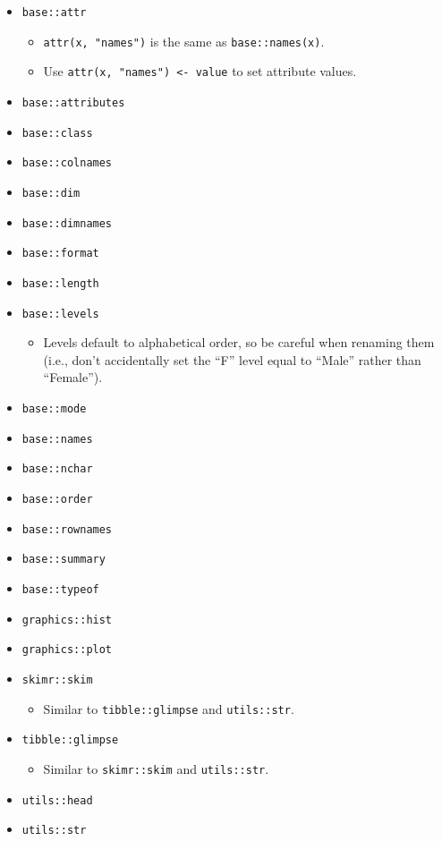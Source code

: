 \documentclass[
]{book}
\providecommand{\tightlist}{%
  \setlength{\itemsep}{0pt}\setlength{\parskip}{0pt}}
\begin{document}
\begin{itemize}
\tightlist
\item
  \texttt{base::attr}

  \begin{itemize}
  \tightlist
  \item
    \texttt{attr(x,\ "names")} is the same as \texttt{base::names(x)}.
  \item
    Use \texttt{attr(x,\ "names")\ \textless{}-\ value} to set attribute values.
  \end{itemize}
\item
  \texttt{base::attributes}
\item
  \texttt{base::class}
\item
  \texttt{base::colnames}
\item
  \texttt{base::dim}
\item
  \texttt{base::dimnames}
\item
  \texttt{base::format}
\item
  \texttt{base::length}
\item
  \texttt{base::levels}

  \begin{itemize}
  \tightlist
  \item
    Levels default to alphabetical order, so be careful when renaming them (i.e., don't accidentally set the ``F'' level equal to ``Male'' rather than ``Female'').
  \end{itemize}
\item
  \texttt{base::mode}
\item
  \texttt{base::names}
\item
  \texttt{base::nchar}
\item
  \texttt{base::order}
\item
  \texttt{base::rownames}
\item
  \texttt{base::summary}
\item
  \texttt{base::typeof}
\item
  \texttt{graphics::hist}
\item
  \texttt{graphics::plot}
\item
  \texttt{skimr::skim}

  \begin{itemize}
  \tightlist
  \item
    Similar to \texttt{tibble::glimpse} and \texttt{utils::str}.
  \end{itemize}
\item
  \texttt{tibble::glimpse}

  \begin{itemize}
  \tightlist
  \item
    Similar to \texttt{skimr::skim} and \texttt{utils::str}.
  \end{itemize}
\item
  \texttt{utils::head}
\item
  \texttt{utils::str}


\end{itemize}
\end{document}
